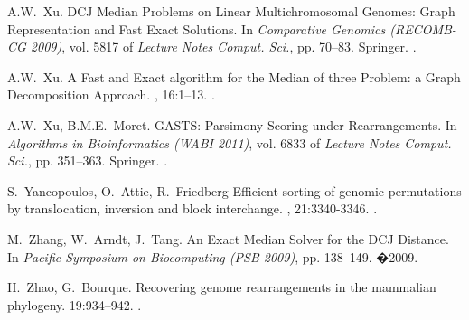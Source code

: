 \documentclass[10pt]{llncs}
\begin{document}
\begin{thebibliography}{10}
  A.W.~Xu.
  \newblock DCJ Median Problems on Linear Multichromosomal Genomes: Graph Representation and Fast Exact Solutions.
  \newblock In {\em Comparative Genomics (RECOMB-CG 2009)}, vol. 5817 of {\em Lecture Notes Comput. Sci.}, pp. 70--83.
  \newblock Springer.
  .

  A.W.~Xu.
  \newblock A Fast and Exact algorithm for the Median of three Problem: a Graph Decomposition Approach.
  , 16:1--13.
  .

  A.W.~Xu, B.M.E.~Moret.
  \newblock GASTS: Parsimony Scoring under Rearrangements.
  \newblock In {\em Algorithms in Bioinformatics (WABI 2011)}, vol. 6833 of {\em Lecture Notes Comput. Sci.}, pp. 351--363.
  \newblock Springer.
  .

  S.~Yancopoulos, O.~Attie, R.~Friedberg
 \newblock Efficient sorting of genomic permutations by translocation, inversion and block interchange. 
  , 21:3340-3346.
  .
 
  M.~Zhang, W.~Arndt, J.~Tang.
  \newblock An Exact Median Solver for the DCJ Distance.
  \newblock In {\em Pacific Symposium on Biocomputing (PSB 2009)}, pp. 138--149.
  \newblock�2009.


  H.~Zhao, G.~Bourque.
  \newblock Recovering genome rearrangements in the mammalian phylogeny. 
   19:934--942.
  .
\end{thebibliography}
\end{document}
